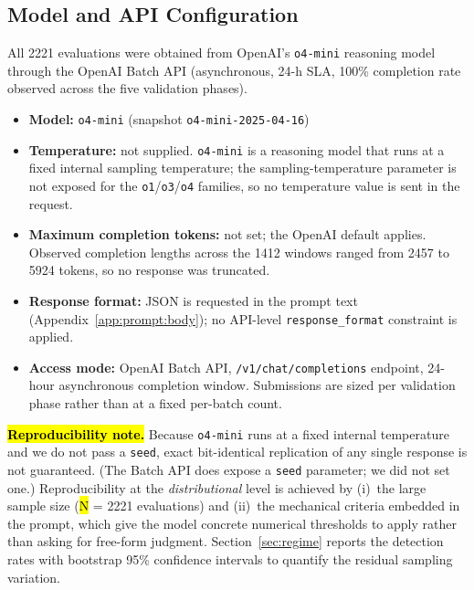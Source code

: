 \documentclass[jrfm,article,accept,moreauthors,pdftex]{Definitions/mdpi}
\begin{document}
\subsection{Model and API Configuration}
\label{app:prompt:config}

All 2221 evaluations were obtained from OpenAI's \texttt{o4-mini}
reasoning model through the OpenAI Batch API (asynchronous, 24-h SLA,
100\% completion rate observed across the five validation phases).

\newpage

\begin{itemize}
    \item \textbf{Model:} \texttt{o4-mini} (snapshot
          \texttt{o4-mini-2025-04-16})
    \item \textbf{Temperature:} not supplied. \texttt{o4-mini} is a
          reasoning model that runs at a fixed internal sampling
          temperature; the sampling-temperature parameter is not
          exposed for the \texttt{o1}/\texttt{o3}/\texttt{o4} families,
          so no temperature value is sent in the request.
    \item \textbf{Maximum completion tokens:} not set; the OpenAI
          default applies. Observed completion lengths across the
          1412 windows ranged from 2457 to 5924 tokens, so no response
          was truncated.
    \item \textbf{Response format:} JSON is requested in the prompt
          text (Appendix~\ref{app:prompt:body}); no API-level
          \texttt{response\_format} constraint is applied.
    \item \textbf{Access mode:} OpenAI Batch API,
          \texttt{/v1/chat/completions} endpoint, 24-hour asynchronous
          completion window. Submissions are sized per validation phase
          rather than at a fixed per-batch count.
\end{itemize}

\noindent\textbf{\hl{Reproducibility note.}} %
Because \texttt{o4-mini} runs at a fixed internal temperature and we do
not pass a \texttt{seed}, exact bit-identical replication of any single
response is not guaranteed. (The Batch API does expose a \texttt{seed}
parameter; we did not set one.)
Reproducibility at the \emph{distributional} level is achieved by
(i)~the large sample size (\hl{N} %
 = 2221 evaluations) and
(ii)~the mechanical criteria embedded in the prompt, which give the
model concrete numerical thresholds to apply rather than asking for
free-form judgment. Section~\ref{sec:regime} reports the detection rates
with bootstrap 95\% confidence intervals to quantify the residual
sampling variation.
\end{document}
